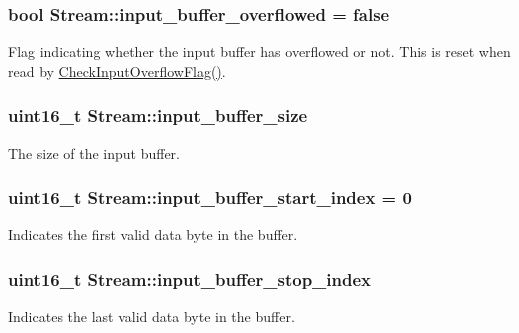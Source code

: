\subsubsection[{\texorpdfstring{input\+\_\+buffer\+\_\+overflowed}{input_buffer_overflowed}}]{\setlength{\rightskip}{0pt plus 5cm}bool Stream\+::input\+\_\+buffer\+\_\+overflowed = false\hspace{0.3cm}{\ttfamily [protected]}}\hypertarget{class_stream_ae7300cb8941cec142c14e8fc9baab9d3}{}\label{class_stream_ae7300cb8941cec142c14e8fc9baab9d3}
Flag indicating whether the input buffer has overflowed or not. This is reset when read by \hyperlink{class_stream_a088c4e68d568acfad715c56f408fe9f8}{Check\+Input\+Overflow\+Flag()}. 
\subsubsection[{\texorpdfstring{input\+\_\+buffer\+\_\+size}{input_buffer_size}}]{\setlength{\rightskip}{0pt plus 5cm}uint16\+\_\+t Stream\+::input\+\_\+buffer\+\_\+size\hspace{0.3cm}{\ttfamily [protected]}}\hypertarget{class_stream_a7373b1d6580a2d5dc74e788b3bb6a596}{}\label{class_stream_a7373b1d6580a2d5dc74e788b3bb6a596}
The size of the input buffer. 
\subsubsection[{\texorpdfstring{input\+\_\+buffer\+\_\+start\+\_\+index}{input_buffer_start_index}}]{\setlength{\rightskip}{0pt plus 5cm}uint16\+\_\+t Stream\+::input\+\_\+buffer\+\_\+start\+\_\+index = 0\hspace{0.3cm}{\ttfamily [protected]}}\hypertarget{class_stream_a6fc009e9e71fa92cbbf9b407ede82a73}{}\label{class_stream_a6fc009e9e71fa92cbbf9b407ede82a73}
Indicates the first valid data byte in the buffer. 
\subsubsection[{\texorpdfstring{input\+\_\+buffer\+\_\+stop\+\_\+index}{input_buffer_stop_index}}]{\setlength{\rightskip}{0pt plus 5cm}uint16\+\_\+t Stream\+::input\+\_\+buffer\+\_\+stop\+\_\+index\hspace{0.3cm}{\ttfamily [protected]}}\hypertarget{class_stream_aaceece6a2defd1f7d9667fcc0be03a7a}{}\label{class_stream_aaceece6a2defd1f7d9667fcc0be03a7a}
Indicates the last valid data byte in the buffer. 
